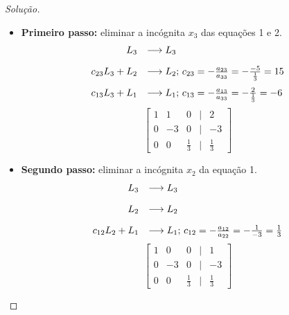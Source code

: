 \documentclass[
	12pt,				%
	openright,			%
	twoside,			%
	a4paper,			%
	english,			%
	french,				%
	brazil,				%
	sumario=tradicional
]{abntex2}
\newenvironment{solution}{
	\begin{proof}[Solução]
}{\end{proof}}
\numberwithin{example}{chapter}
\numberwithin{remark}{chapter}
\numberwithin{definition}{chapter}
\numberwithin{figure}{chapter}
\begin{document}
\begin{solution}
\begin{itemize}
        \begin{itemize}
            \item \textbf{Primeiro passo: } eliminar a incógnita $x_3$ das equações 1 e 2.
            $$
            	\begin{array}{r l}
	                L_3 & \longrightarrow L_3\\[10pt]
                	c_{23}L_3 + L_2 & \longrightarrow L_2\text{; } c_{23}=-\frac{a_{23}}{a_{33}}=-\frac{-5}{\frac{1}{3}}=15\\[10pt]
            	    c_{13}L_3+L_1 & \longrightarrow L_1\text{; } c_{13}=-\frac{a_{13}}{a_{33}}=-\frac{2}{\frac{1}{3}}=-6
                \end{array}
            $$
            $$
	            \begin{bmatrix}
                	1 & 1 & 0 &|& 2\\
	                0 & -3 & 0 &|& -3\\
        	        0 & 0 & \frac{1}{3} &|& \frac{1}{3}
        	    \end{bmatrix}
	        $$

            \item \textbf{Segundo passo: } eliminar a incógnita $x_2$ da equação 1.
            $$
            	\begin{array}{r l}
	                L_3 & \longrightarrow L_3\\[10pt]
                	L_2 & \longrightarrow L_2\\[10pt]
            	    c_{12}L_2+L_1 & \longrightarrow L_1\text{; } c_{12}=-\frac{a_{12}}{a_{22}}=-\frac{1}{-3}=\frac{1}{3}
                \end{array}
            $$
            $$
	            \begin{bmatrix}
                	1 & 0 & 0 &|& 1\\
	                0 & -3 & 0 &|& -3\\
        	        0 & 0 & \frac{1}{3} &|& \frac{1}{3}
        	    \end{bmatrix}
	        $$
        \end{itemize}


\end{itemize}
\end{solution}
\end{document}
